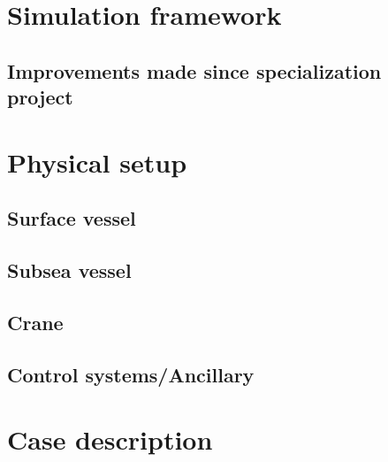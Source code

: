 \documentclass[class=article, crop=false]{standalone}
\begin{document}
\section{Simulation framework}
\subsection{Improvements made since specialization project}

\section{Physical setup}
\subsection{Surface vessel}
\subsection{Subsea vessel}
\subsection{Crane}
\subsection{Control systems/Ancillary}
\section{Case description}
\end{document}
